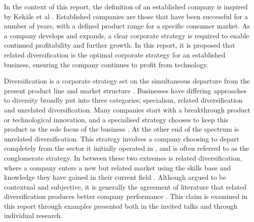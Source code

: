 

In the context of this report, the definition of an established company is inspired by Kek{\"a}le et al \cite{kekale2007successful}. 
Established companies are those that have been successful for a number of years, with a defined product range for a specific consumer market. 
As a company develops and expands, a clear corporate strategy is required to enable continued profitability and further growth.
In this report, it is proposed that related diversification is the optimal corporate strategy for an established business, ensuring the company continues to profit from technology.

Diversification is a corporate strategy set on the simultaneous departure from the present product line and market structure \cite{ansoff1957strategies}.
Businesses have differing approaches to diversity broadly put into three categories; specialism, related diversification and unrelated diversification. 
Many companies start with a breakthrough product or technological innovation, and a specialised strategy chooses to keep this product as the sole focus of the business \cite{johnson2008exploring}.
At the other end of the spectrum is unrelated diversification.
This strategy involves a company choosing to depart completely from the sector it initially operated in \cite{johnson2008exploring}, and is often referred to as the conglomerate strategy.
In between these two extremes is related diversification, where a company enters a new but related market using the skills base and knowledge they have gained in their current field \cite{johnson2008exploring}. 
Although argued to be contextual and subjective, it is generally the agreement of literature that related diversification produces better company performance \cite{johnson2008exploring, SMJ:SMJ334, SMJ:SMJ82}. 
This claim is examined in this report through examples presented both in the invited talks and through individual research.

